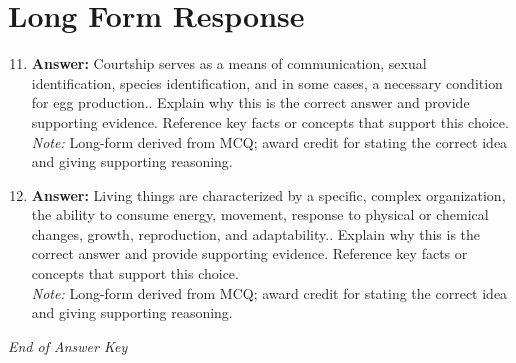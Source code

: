 \documentclass[12pt]{article}
\begin{document}
\section*{Long Form Response}
\begin{enumerate}[label=\arabic*.]
\setcounter{enumi}{10}
\item \textbf{Answer:} Courtship serves as a means of communication, sexual identification, species identification, and in some cases, a necessary condition for egg production.. Explain why this is the correct answer and provide supporting evidence. Reference key facts or concepts that support this choice.
\\ \textit{Note:} Long-form derived from MCQ; award credit for stating the correct idea and giving supporting reasoning.
\item \textbf{Answer:} Living things are characterized by a specific, complex organization, the ability to consume energy, movement, response to physical or chemical changes, growth, reproduction, and adaptability.. Explain why this is the correct answer and provide supporting evidence. Reference key facts or concepts that support this choice.
\\ \textit{Note:} Long-form derived from MCQ; award credit for stating the correct idea and giving supporting reasoning.
\end{enumerate}

\vfill
\noindent\textit{End of Answer Key}
\end{document}
